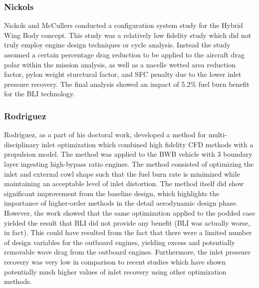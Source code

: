 \documentclass[12pt]{gatech-thesis}
\begin{document}
\subsubsection{Nickols}

\indent Nickols and McCullers conducted a configuration system study for the Hybrid Wing Body concept.  This study was a relatively low fidelity study which did not truly employ engine design techniques or cycle analysis.  Instead the study assumed a certain percentage drag reduction to be applied to the aircraft drag polar within the mission analysis, as well as a nacelle wetted area reduction factor, pylon weight sturctural factor, and SFC penalty due to the lower inlet pressure recovery.  The final analysis showed an impact of 5.2\% fuel burn benefit for the BLI technology.

\subsubsection{Rodriguez}
\indent Rodriguez, as a part of his doctoral work, developed a method for multi-disciplinary inlet optimization which combined high fidelity CFD methods with a propulsion model.  The method was applied to the BWB vehicle with 3 boundary layer ingesting high-bypass ratio engines.  The method consisted of optimizing the inlet and external cowl shape such that the fuel burn rate is minimized while maintaining an acceptable level of inlet distortion.  The method itself did show significant improvement from the baseline design, which highlights the importance of higher-order methods in the detail aerodynamic design phase.  However, the work showed that the same optimization applied to the podded case yielded the result that BLI did not provide any benefit (BLI was actually worse, in fact).  This could have resulted from the fact that there were a limited number of design variables for the outboard engines, yielding excess and potentially removable wave drag from the outboard engines.  Furthermore, the inlet pressure recovery was very low in comparison to recent studies which have shown potentially much higher values of inlet recovery using other optimization methods.
\end{document}
